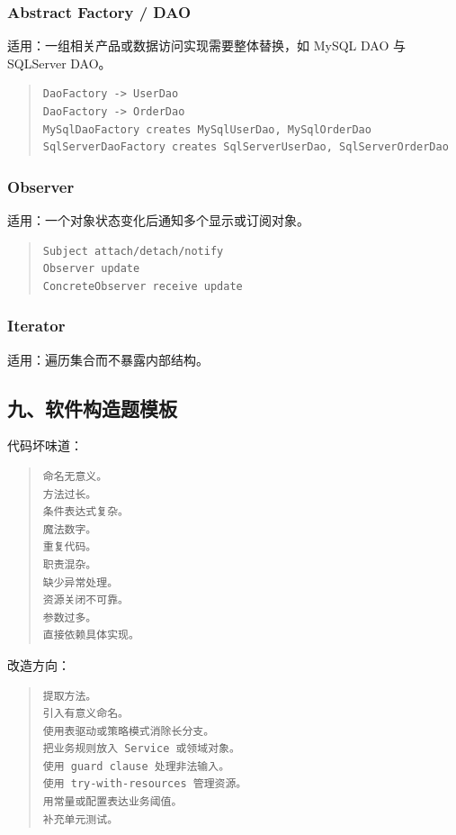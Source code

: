 \documentclass[UTF8,zihao=-4]{ctexart}
\begin{document}
\subsubsection{Abstract Factory / DAO}


适用：一组相关产品或数据访问实现需要整体替换，如 MySQL DAO 与 SQLServer DAO。


\begin{quote}
\footnotesize
\begin{verbatim}
DaoFactory -> UserDao
DaoFactory -> OrderDao
MySqlDaoFactory creates MySqlUserDao, MySqlOrderDao
SqlServerDaoFactory creates SqlServerUserDao, SqlServerOrderDao
\end{verbatim}
\end{quote}


\subsubsection{Observer}


适用：一个对象状态变化后通知多个显示或订阅对象。


\begin{quote}
\footnotesize
\begin{verbatim}
Subject attach/detach/notify
Observer update
ConcreteObserver receive update
\end{verbatim}
\end{quote}


\subsubsection{Iterator}


适用：遍历集合而不暴露内部结构。


\subsection{九、软件构造题模板}


代码坏味道：


\begin{quote}
\footnotesize
\begin{verbatim}
命名无意义。
方法过长。
条件表达式复杂。
魔法数字。
重复代码。
职责混杂。
缺少异常处理。
资源关闭不可靠。
参数过多。
直接依赖具体实现。
\end{verbatim}
\end{quote}


改造方向：


\begin{quote}
\footnotesize
\begin{verbatim}
提取方法。
引入有意义命名。
使用表驱动或策略模式消除长分支。
把业务规则放入 Service 或领域对象。
使用 guard clause 处理非法输入。
使用 try-with-resources 管理资源。
用常量或配置表达业务阈值。
补充单元测试。
\end{verbatim}
\end{quote}
\end{document}

